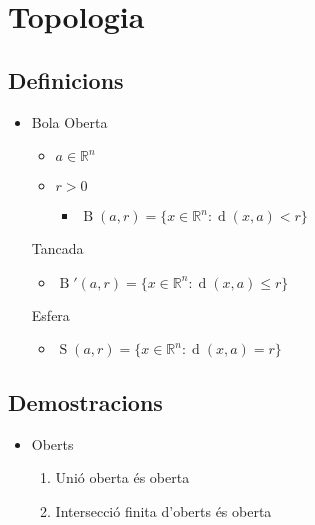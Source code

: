 \documentclass{article}
\newcommand{\R}{\mathbb{R}}
\DeclareMathOperator{\distancia}{d}
\DeclareMathOperator{\bola}{B}
\DeclareMathOperator{\sfere}{S}
\begin{document}
\section{Topologia}
\subsection*{Definicions}
\begin{itemize}
\item Bola
	\subitem Oberta
	\begin{itemize}
	\item $a \in \R^n$
	\item $r > 0$
		\begin{itemize}
		\item $\bola(a, r) = \{x \in \R^n: \distancia(x, a) < r \}$
		\end{itemize}
	\end{itemize}
	\subitem Tancada
	\begin{itemize}
	\item $\bola'(a, r) = \{x \in \R^n: \distancia(x, a) \le r \}$
	\end{itemize}
	\subitem Esfera
	\begin{itemize}
	\item $\sfere(a, r) = \{x \in \R^n: \distancia(x, a) = r \}$
	\end{itemize}
\end{itemize}

\subsection*{Demostracions}
\begin{itemize}
\item Oberts
	\begin{enumerate}
	\item Unió oberta és oberta
	\item Intersecció finita d'oberts és oberta
	\end{enumerate}
\end{itemize}
\end{document}
